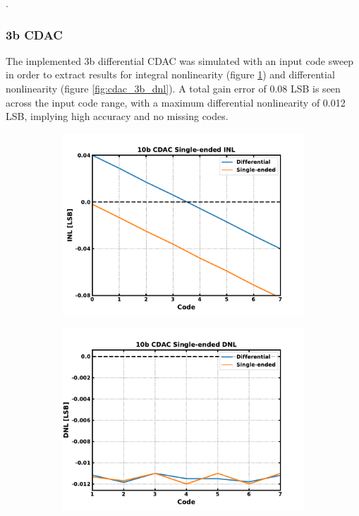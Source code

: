 {\color{white}.}
\FloatBarrier\pagebreak
\subsubsection{3b CDAC}\label{sec:res_cdac_3b}
The implemented 3b differential CDAC was simulated with an input code sweep in order to extract results for integral nonlinearity (figure \ref{fig:cdac_3b_inl}) and differential nonlinearity (figure \ref{fig:cdac_3b_dnl}). A total gain error of 0.08 LSB is seen across the input code range, with a maximum differential nonlinearity of 0.012 LSB, implying high accuracy and no missing codes.

	\begin{figure}[htb!]
	    \centering
	    \begin{subfigure}{0.5\textwidth}
	        \centering
	        \includegraphics[width=1\textwidth, angle=0]{./figs/results/cdac_3b_inl}
	        \caption{ }
	        \label{fig:cdac_3b_inl}
	    \end{subfigure}%
	    \begin{subfigure}{0.5\textwidth}
	        \centering
	        \includegraphics[width=1\textwidth, angle=0]{./figs/results/cdac_3b_dnl}

\end{subfigure}
\end{figure}

